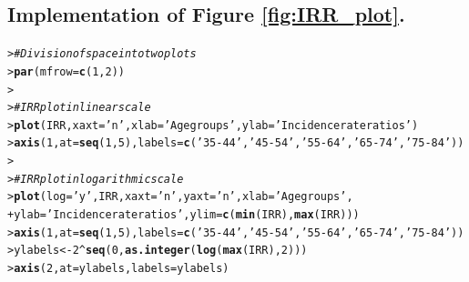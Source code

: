 \documentclass[10pt,a4paper,twoside]{article}\usepackage[]{graphicx}\usepackage[]{xcolor}
\makeatletter
\newcommand{\hlnum}[1]{\textcolor[rgb]{0.686,0.059,0.569}{#1}}%
\newcommand{\hlstr}[1]{\textcolor[rgb]{0.192,0.494,0.8}{#1}}%
\newcommand{\hlcom}[1]{\textcolor[rgb]{0.678,0.584,0.686}{\textit{#1}}}%
\newcommand{\hlopt}[1]{\textcolor[rgb]{0,0,0}{#1}}%
\newcommand{\hlstd}[1]{\textcolor[rgb]{0.345,0.345,0.345}{#1}}%
\newcommand{\hlkwb}[1]{\textcolor[rgb]{0.69,0.353,0.396}{#1}}%
\newcommand{\hlkwc}[1]{\textcolor[rgb]{0.333,0.667,0.333}{#1}}%
\newcommand{\hlkwd}[1]{\textcolor[rgb]{0.737,0.353,0.396}{\textbf{#1}}}%
\newenvironment{kframe}{%
 \def\at@end@of@kframe{}%
 \ifinner\ifhmode%
  \def\at@end@of@kframe{\end{minipage}}%
  \begin{minipage}{\columnwidth}%
 \fi\fi%
 \def\FrameCommand##1{\hskip\@totalleftmargin \hskip-\fboxsep
 \colorbox{shadecolor}{##1}\hskip-\fboxsep
     \hskip-\linewidth \hskip-\@totalleftmargin \hskip\columnwidth}%
 \MakeFramed {\advance\hsize-\width
   \@totalleftmargin\z@ \linewidth\hsize
   \@setminipage}}%
 {\par\unskip\endMakeFramed%
 \at@end@of@kframe}
\newenvironment{knitrout}{}{} %
\makeatother
\begin{document}
\subsection{Implementation of Figure \ref{fig:IRR_plot}.}
\label{app:IRR_plot}
\begin{knitrout}\footnotesize
{}\color{fgcolor}\begin{kframe}
\begin{alltt}
\hlstd{> }\hlcom{# Division of space into two plots}
\hlstd{> }\hlkwd{par}\hlstd{(}\hlkwc{mfrow} \hlstd{=} \hlkwd{c}\hlstd{(}\hlnum{1}\hlstd{,} \hlnum{2}\hlstd{))}
\hlstd{> }
\hlstd{> }\hlcom{# IRR plot in linear scale}
\hlstd{> }\hlkwd{plot}\hlstd{(IRR,} \hlkwc{xaxt} \hlstd{=} \hlstr{'n'}\hlstd{,} \hlkwc{xlab} \hlstd{=} \hlstr{'Age groups'}\hlstd{,} \hlkwc{ylab} \hlstd{=} \hlstr{'Incidence rate ratios'}\hlstd{)}
\hlstd{> }\hlkwd{axis}\hlstd{(}\hlnum{1}\hlstd{,} \hlkwc{at} \hlstd{=} \hlkwd{seq}\hlstd{(}\hlnum{1}\hlstd{,} \hlnum{5}\hlstd{),} \hlkwc{labels} \hlstd{=} \hlkwd{c}\hlstd{(}\hlstr{'35-44'}\hlstd{,} \hlstr{'45-54'}\hlstd{,} \hlstr{'55-64'}\hlstd{,} \hlstr{'65-74'}\hlstd{,} \hlstr{'75-84'}\hlstd{))}
\hlstd{> }
\hlstd{> }\hlcom{# IRR plot in logarithmic scale}
\hlstd{> }\hlkwd{plot}\hlstd{(}\hlkwc{log} \hlstd{=} \hlstr{'y'}\hlstd{, IRR,} \hlkwc{xaxt} \hlstd{=} \hlstr{'n'}\hlstd{,} \hlkwc{yaxt} \hlstd{=} \hlstr{'n'} \hlstd{,} \hlkwc{xlab} \hlstd{=} \hlstr{'Age groups'}\hlstd{,}
\hlstd{+ }     \hlkwc{ylab} \hlstd{=} \hlstr{'Incidence rate ratios'}\hlstd{,} \hlkwc{ylim} \hlstd{=} \hlkwd{c}\hlstd{(}\hlkwd{min}\hlstd{(IRR),} \hlkwd{max}\hlstd{(IRR)))}
\hlstd{> }\hlkwd{axis}\hlstd{(}\hlnum{1}\hlstd{,} \hlkwc{at} \hlstd{=} \hlkwd{seq}\hlstd{(}\hlnum{1}\hlstd{,} \hlnum{5}\hlstd{),} \hlkwc{labels} \hlstd{=} \hlkwd{c}\hlstd{(}\hlstr{'35-44'}\hlstd{,} \hlstr{'45-54'}\hlstd{,} \hlstr{'55-64'}\hlstd{,} \hlstr{'65-74'}\hlstd{,} \hlstr{'75-84'}\hlstd{))}
\hlstd{> }\hlstd{ylabels} \hlkwb{<-} \hlnum{2}\hlopt{^}\hlkwd{seq}\hlstd{(}\hlnum{0}\hlstd{,} \hlkwd{as.integer}\hlstd{(}\hlkwd{log}\hlstd{(}\hlkwd{max}\hlstd{(IRR),} \hlnum{2}\hlstd{)))}
\hlstd{> }\hlkwd{axis}\hlstd{(}\hlnum{2}\hlstd{,} \hlkwc{at} \hlstd{= ylabels,} \hlkwc{labels} \hlstd{= ylabels)}
\end{alltt}
\end{kframe}
\end{knitrout}
\end{document}
